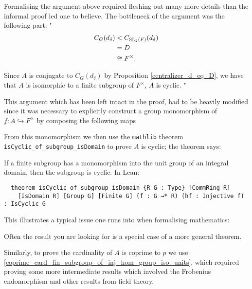 \begin{remark}
Formalising the argument above required fleshing out many more details than the informal proof led one to
believe. The bottleneck of the argument was the following part:
"
\begin{align*}  C_G(d_\delta) &<  C_{\operatorname{SL}_2(F)}(d_\delta) 
  \\ &= D  
  \\ &\cong F^\times.  
  \end{align*}

Since $A$ is conjugate to $C_G(d_\delta)$ by Proposition \ref{centralizer_d_eq_D}, 
we have that $A$ is isomorphic to a finite subgroup of $F^\times$, $A$ is cyclic.
"

This argument which has been left intact in the proof, had to be heavily modified since it was necessary to explicitly 
construct a group monomorphism of $f : A \hookrightarrow F^\times$
by composing the following maps

\begin{center}
\end{center}

From this monomorphism we then use the \texttt{mathlib} theorem \texttt{isCyclic\_of\_subgroup\_isDomain} to prove $A$ is cyclic; the theorem says: 

If a finite subgroup has a monomorphism into the unit group of an integral domain, then the subgroup is cyclic. In Lean:

\begin{footnotesize}
  \begin{verbatim}
  theorem isCyclic_of_subgroup_isDomain {R G : Type} [CommRing R] 
    [IsDomain R] [Group G] [Finite G] (f : G →* R) (hf : Injective f) : IsCyclic G
  \end{verbatim}
  \end{footnotesize}

This illustrates a typical issue one runs into when formalising mathematics:

Often the result you are looking for is a special case of a more general theorem.

Similarly, to prove the cardinality of $A$ is coprime to $p$ we use \ref{coprime_card_fin_subgroup_of_inj_hom_group_iso_units}, which required
proving some more intermediate results which involved the Frobenius endomorphism and other results from field theory.
\end{remark}

